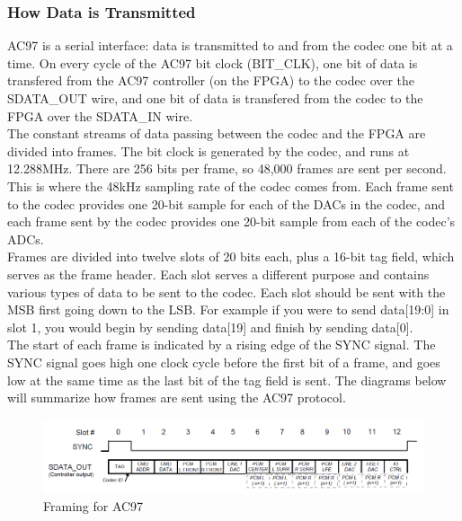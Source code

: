 \documentclass[11pt]{article}
\begin{document}
\subsubsection{How Data is Transmitted}
AC97 is a serial interface: data is transmitted to and from the codec one bit at a time. On every cycle of the AC97 bit clock (BIT\_CLK), one bit of data is transfered from the AC97 controller (on the FPGA) to the codec over the SDATA\_OUT wire, and one bit of data is transfered from the codec to the FPGA over the SDATA\_IN wire. \\

The constant streams of data passing between the codec and the FPGA are divided into frames. The bit clock is generated by the codec, and runs at 12.288MHz. There are 256 bits per frame, so 48,000 frames are sent per second. This is where the 48kHz sampling rate of the codec comes from. Each frame sent to the codec provides one 20-bit sample for each of the DACs in the codec, and each frame sent by the codec provides one 20-bit sample from each of the codec's ADCs. \\

Frames are divided into twelve slots of 20 bits each, plus a 16-bit tag field, which serves as the frame header. Each slot serves a different purpose and contains various types of data to be sent to the codec. Each slot should be sent with the MSB first going down to the LSB. For example if you were to send data[19:0] in slot 1, you would begin by sending data[19] and finish by sending data[0]. \\

The start of each frame is indicated by a rising edge of the SYNC signal. The SYNC signal goes high one clock cycle before the first bit of a frame, and goes low at the same time as the last bit of the tag field is sent. The diagrams below will summarize how frames are sent using the AC97 protocol. \\

\begin{figure}[hbt]
	\begin{center}
		\includegraphics[width=6in]{ac97_framing}
		\caption{Framing for AC97}
	\end{center}
\end{figure}
\end{document}
